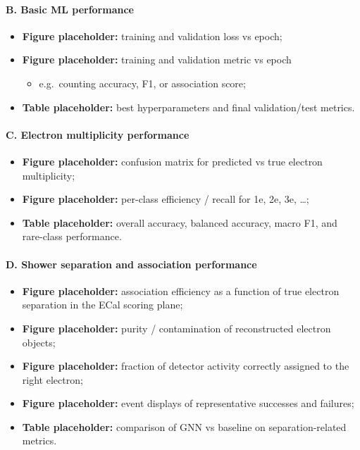 \paragraph{B. Basic ML performance}
\begin{itemize}
    \item \textbf{Figure placeholder:} training and validation loss vs epoch;
    \item \textbf{Figure placeholder:} training and validation metric vs epoch
    \begin{itemize}
        \item e.g.\ counting accuracy, F1, or association score;
    \end{itemize}
    \item \textbf{Table placeholder:} best hyperparameters and final validation/test metrics.
\end{itemize}

\paragraph{C. Electron multiplicity performance}
\begin{itemize}
    \item \textbf{Figure placeholder:} confusion matrix for predicted vs true electron multiplicity;
    \item \textbf{Figure placeholder:} per-class efficiency / recall for 1e, 2e, 3e, \dots;
    \item \textbf{Table placeholder:} overall accuracy, balanced accuracy, macro F1, and rare-class performance.
\end{itemize}

\paragraph{D. Shower separation and association performance}
\begin{itemize}
    \item \textbf{Figure placeholder:} association efficiency as a function of true electron separation in the ECal scoring plane;
    \item \textbf{Figure placeholder:} purity / contamination of reconstructed electron objects;
    \item \textbf{Figure placeholder:} fraction of detector activity correctly assigned to the right electron;
    \item \textbf{Figure placeholder:} event displays of representative successes and failures;
    \item \textbf{Table placeholder:} comparison of GNN vs baseline on separation-related metrics.
\end{itemize}

